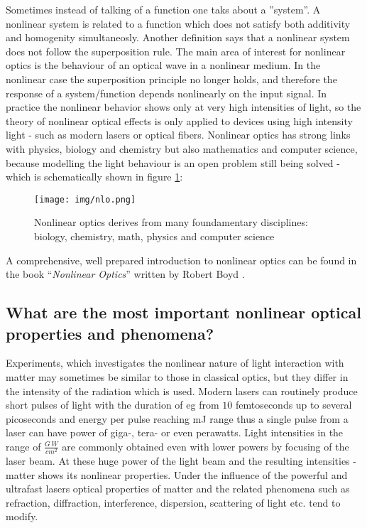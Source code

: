 \documentclass[12pt,twoside,a4paper]{article}
\numberwithin{equation}{subsection}
\numberwithin{figure}{subsection}
\begin{document}
Sometimes instead of talking of a function one taks about a ''system''. A nonlinear system is related to a function which does not
satisfy both additivity and homogenity simultaneosly. Another definition says that a nonlinear system does not follow the
superposition rule. The main area of interest for nonlinear optics is the behaviour of an optical wave in a nonlinear medium. In
the nonlinear case the superposition principle no longer holds, and therefore the response of a system/function depends nonlinearly
on the input signal. In practice the nonlinear behavior shows only at very high intensities of light, so the theory of nonlinear
optical effects is only applied to devices using high intensity light - such as modern lasers or optical fibers. Nonlinear optics
has strong links with physics, biology and chemistry but also mathematics and computer science, because modelling the
light behaviour is an open problem still being solved - which is schematically shown in figure \ref{fig:nonlinear_optics}:

\begin{figure} 
 \texttt{[image: img/nlo.png]}
 \caption{Nonlinear optics derives from many foundamentary disciplines: biology, chemistry, math, physics and computer
 science \label{fig:nonlinear_optics}}
 
\end{figure}

A comprehensive, well prepared introduction to nonlinear optics can be found in the book ``\textit{Nonlinear Optics}'' written 
by Robert Boyd \cite{boyd_nlo}.

\subsection{What are the most important nonlinear optical properties and phenomena?} \label{chap:introducion_phenomena}

Experiments, which investigates the nonlinear nature of light interaction with matter may sometimes be similar to those in
classical optics, but they differ in the intensity of the radiation which is used. Modern lasers can routinely produce short pulses
of light with the duration of eg from $10$ femtoseconds up to several picoseconds and energy per pulse reaching mJ range thus a
single pulse from a laser can have power of giga-, tera- or even perawatts. Light intensities in the range of $\frac{G\,W}{cm^2}$
are commonly obtained even with lower powers by focusing of the laser beam. At these huge power of the light beam and the resulting
intensities - matter shows its nonlinear properties. Under the influence of the powerful and ultrafast lasers optical properties of
matter and the related phenomena such as refraction, diffraction, interference, dispersion, scattering of light etc. tend to
modify.
\end{document}
